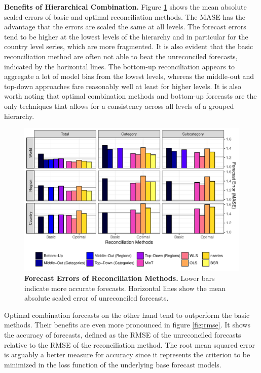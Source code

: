 \documentclass[a4paper,fleqn,11pt]{article}
\begin{document}
\noindent\textbf{Benefits of Hierarchical Combination.} Figure \ref{fig:mase} shows the mean absolute scaled errors of basic and optimal reconciliation methods. The MASE has the advantage that the errors are scaled the same at all levels. The forecast errors tend to be higher at the lowest levels of the hierarchy and in particular for the country level series, which are more fragmented. It is also evident that the basic reconciliation method are often not able to beat the unreconciled forecasts, indicated by the horizontal lines. The bottom-up reconciliation appears to aggregate a lot of model bias from the lowest levels, whereas the middle-out and top-down approaches fare reasonably well at least for higher levels. It is also worth noting that optimal combination methods and bottom-up forecasts are the only techniques that allows for a consistency across all levels of a grouped hierarchy.
\begin{figure}[H]
 	\includegraphics[width=\textwidth]{fig/fig_eval_mase}
 	\caption[Forecast Errors of Reconciliation Methods]{\textbf{Forecast Errors of Reconciliation Methods.} Lower bars indicate more accurate forecasts. Horizontal lines show the mean absolute scaled error of unreconciled forecasts.}\label{fig:mase}
 \end{figure}
Optimal combination forecasts on the other hand tend to outperform the basic methods. 
Their benefits are even more pronounced in figure \ref{fig:rmse}. It shows the accuracy of forecasts, defined as the RMSE of the unreconciled forecasts relative to the RMSE of the reconciliation method. The root mean squared error is arguably a better measure for accuracy since it represents the criterion to be minimized in the loss function of the underlying base forecast models.\\
\end{document}

